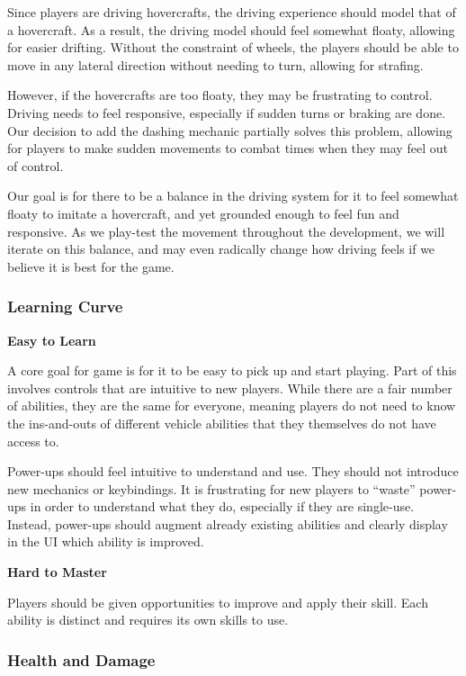 \documentclass{article}
\theoremstyle{definition}
\begin{document}
Since players are driving hovercrafts, the driving experience should model
that of a hovercraft. As a result, the driving model should feel somewhat
floaty, allowing for easier drifting. Without the constraint of wheels, the
players should be able to move in any lateral direction without needing to
turn, allowing for strafing.

However, if the hovercrafts are too floaty, they may be frustrating to control.
Driving needs to feel responsive, especially if sudden turns or braking are
done. Our decision to add the dashing mechanic partially solves this problem,
allowing for players to make sudden movements to combat times when they may
feel out of control.

Our goal is for there to be a balance in the driving system for it to feel
somewhat floaty to imitate a hovercraft, and yet grounded enough to feel fun
and responsive. As we play-test the movement throughout the development, we
will iterate on this balance, and may even radically change how driving feels
if we believe it is best for the game.


\subsubsection{Learning Curve}

\textbf{Easy to Learn}

A core goal for game is for it to be easy to pick up and start playing.
Part of this involves controls that are intuitive to new players. While there
are a fair number of abilities, they are the same for everyone, meaning players
do not need to know the ins-and-outs of different vehicle abilities that they
themselves do not have access to.

Power-ups should feel intuitive to understand and use. They should not
introduce new mechanics or keybindings. It is frustrating for new players to
``waste'' power-ups in order to understand what they do, especially if they are
single-use. Instead, power-ups should augment already existing abilities and
clearly display in the UI which ability is improved.

\textbf{Hard to Master}

Players should be given opportunities to improve and apply their skill. Each
ability is distinct and requires its own skills to use.

\subsubsection{Health and Damage}
\end{document}
